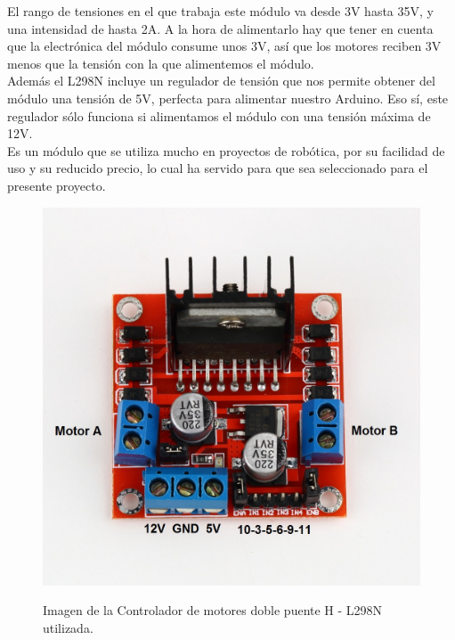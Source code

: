El rango de tensiones en el que trabaja este módulo va desde 3V hasta 35V, y una intensidad de hasta 2A. A la hora de alimentarlo hay que tener en cuenta que la 
electrónica del módulo consume unos 3V, así que los motores reciben 3V menos que la tensión con la que alimentemos el módulo.\\

Además el L298N incluye un regulador de tensión que nos permite obtener del módulo una tensión de 5V, perfecta para alimentar nuestro Arduino. Eso sí, este regulador sólo 
funciona si alimentamos el módulo con una tensión máxima de 12V.\\

Es un módulo que se utiliza mucho en proyectos de robótica, por su facilidad de uso y su reducido precio, lo cual ha servido para que sea seleccionado para el presente proyecto.

\begin{figure}[H]
  \begin{center}
    \includegraphics[scale=0.8]{imagenes/l298n.jpg}\\
    \caption{Imagen de la Controlador de motores doble puente H - L298N utilizada.}
  \end{center}
\end{figure}



